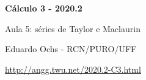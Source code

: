 \documentclass[oneside,12pt]{article}
\begin{document}


\long{}
\long{}
\long{}
\long{}
\long{}
\long{}
\long{}
\long{}
\long{}
\long{}
\long{}

\long{}
\long{}

\def\frown{\ensuremath{{=}{(}}}
\def\True {\mathbf{V}}
\def\False{\mathbf{F}}
\def\D    {\displaystyle}
\def\derivs{\mathsf{derivs}}

\def\drafturl{http://angg.twu.net/LATEX/2020-2-C3.pdf}
\def\drafturl{http://angg.twu.net/2020.2-C3.html}
\def\draftfooter{\tiny \href{\drafturl}{\jobname{}} \ColorBrown{\shorttoday{} \hours}}



%

\thispagestyle{empty}

\begin{center}

\vspace*{1.2cm}

{\bf \Large Cálculo 3 - 2020.2}

\bsk

Aula 5: séries de Taylor e Maclaurin

\bsk

Eduardo Ochs - RCN/PURO/UFF

\url{http://angg.twu.net/2020.2-C3.html}

\end{center}
\end{document}
